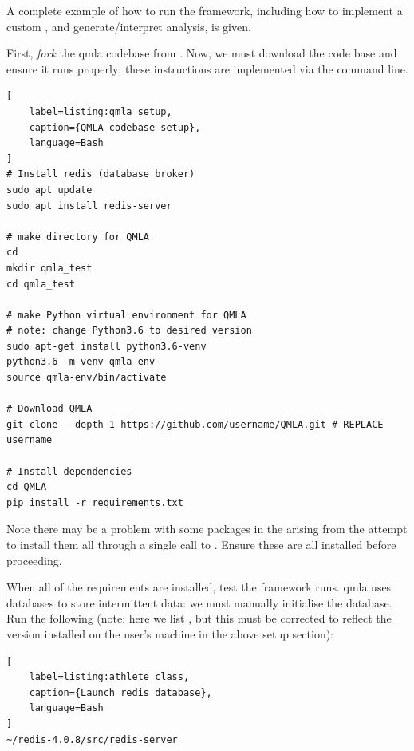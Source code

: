 A complete example of how to run the  framework, 
    including how to implement a custom , 
    and generate/interpret analysis, is given.
\par 

First, \emph{fork} the \gls{qmla} codebase from \cite{flynn2021QMLA}\footnotemark.
Now, we must download the code base and ensure it runs properly;
    these instructions are implemented via the command line\footnotemark. 
    
\begin{lstlisting}[
    label=listing:qmla_setup,
    caption={QMLA codebase setup},
    language=Bash
]
# Install redis (database broker)
sudo apt update
sudo apt install redis-server
 
# make directory for QMLA
cd
mkdir qmla_test
cd qmla_test

# make Python virtual environment for QMLA
# note: change Python3.6 to desired version
sudo apt-get install python3.6-venv 
python3.6 -m venv qmla-env    
source qmla-env/bin/activate

# Download QMLA
git clone --depth 1 https://github.com/username/QMLA.git # REPLACE username

# Install dependencies
cd QMLA 
pip install -r requirements.txt 
\end{lstlisting}

Note there may be a problem with some packages in the  arising from the attempt to install them all through
a single call to . 
Ensure these are all installed before proceeding. 
\par 

When all of the requirements are installed, test the framework runs. 
\gls{qmla} uses  databases to store intermittent data:
    we must manually initialise the database. 
Run the following 
    (note: here we list , but this must be corrected to reflect the 
    version installed on the user's machine in the above setup section):
\begin{lstlisting}[
    label=listing:athlete_class,
    caption={Launch redis database},
    language=Bash
]
~/redis-4.0.8/src/redis-server
\end{lstlisting}

